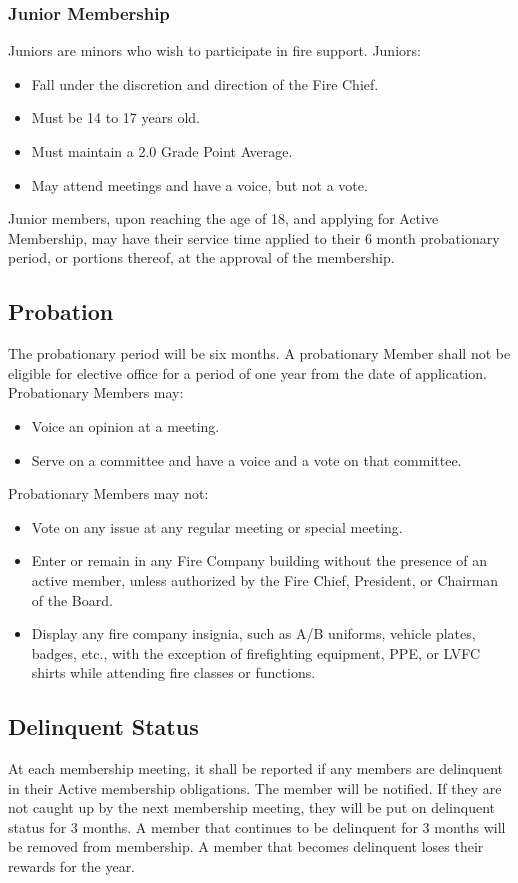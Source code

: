 ﻿\documentclass[12pt,letterpaper]{article}
\begin{document}
\subsubsection{Junior Membership}
Juniors  are minors who wish to participate in fire support.  Juniors:
\begin{itemize}
\item Fall under the discretion and direction of the Fire Chief.
\item Must be 14 to 17 years old.
\item Must maintain a 2.0 Grade Point Average.
\item May attend meetings and have a voice, but not a vote.
\end{itemize}
Junior members, upon reaching the age of 18, and applying for Active Membership, may have their service time applied to their 6 month probationary period, or portions thereof, at the approval of the membership.

\subsection{Probation}
The probationary period will be six months.  A probationary Member shall not be eligible for elective office for a period of one year from the date of application.
Probationary Members may:
\begin{itemize}
\item Voice an opinion at a meeting.
\item Serve on a committee and have a voice and a vote on that committee.
\end{itemize}
Probationary Members may not: 
\begin{itemize}
\item Vote on any issue at any regular meeting or special meeting.
\item Enter or remain in any Fire Company building without the presence of an active member, unless authorized by the Fire Chief, President, or Chairman of the Board. 
\item Display any fire company insignia, such as A/B uniforms, vehicle plates, badges, etc., with the exception of firefighting equipment, PPE, or LVFC shirts while attending fire classes or functions.
\end{itemize}

\subsection{Delinquent Status}
At each membership meeting, it shall be reported if any members are delinquent in their Active membership obligations.  The member will be notified.  If they are not caught up by the next membership meeting, they will be put on delinquent status for 3 months.  A member that continues to be delinquent for 3 months will be removed from membership.  A member that becomes delinquent loses their rewards for the year.
\end{document}
